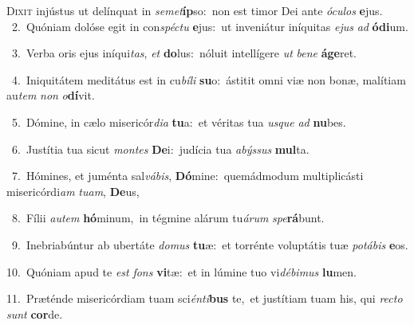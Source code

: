 \lettrine{\initial\textcolor{\initialcolor}{D}}{ixit} injústus ut delínquat in \textit{se}\-\textit{met}\textbf{íp}so:~\star non est timor Dei ante \textit{ó}\-\textit{cu}\textit{los} \textbf{e}\-jus.\\
{\numbfont\textcolor{\numbcolor}{~2.}}~Quóniam dolóse egit in con\-\textit{spéc}\-\textit{tu} \textbf{e}\-jus:~\star ut inveniátur iníquitas \textit{e}\-\textit{jus} \textit{ad} \textbf{ó}\-\textbf{di}um.\par
{\numbfont\textcolor{\numbcolor}{~3.}}~Verba oris ejus iníqui\-\textit{tas}\-, \textit{et} \textbf{do}\-lus:~\star nóluit intellígere \textit{ut} \textit{be}\-\textit{ne} \textbf{á}\-\textbf{ge}ret.\par
{\numbfont\textcolor{\numbcolor}{~4.}}~Iniquitátem meditátus est in cu\-\textit{bí}\-\textit{li} \textbf{su}\-o:~\star ástitit omni viæ non bonæ, malítiam au\textit{tem} \textit{non} \textit{o}\-\textbf{dí}vit.\par
{\numbfont\textcolor{\numbcolor}{~5.}}~Dómine, in cælo misericór\-\textit{di}\-\textit{a} \textbf{tu}\-a:~\star et véritas tua \textit{us}\-\textit{que} \textit{ad} \textbf{nu}\-bes.\par
{\numbfont\textcolor{\numbcolor}{~6.}}~Justítia tua sicut \textit{mon}\-\textit{tes} \textbf{De}\-i:~\star judícia tua \textit{a}\-\textit{býs}\textit{sus} \textbf{mul}\-ta.\par
{\numbfont\textcolor{\numbcolor}{~7.}}~Hómines, et juménta sal\-\textit{vá}\-\textit{bis}, \textbf{Dó}\-mine:~\star quemádmodum multiplicásti misericórdi\textit{am} \textit{tu}\-\textit{am}, \textbf{De}\-us,\par
{\numbfont\textcolor{\numbcolor}{~8.}}~Fílii \textit{au}\-\textit{tem} \textbf{hó}\-minum,~\star in tégmine alárum tu\-\textit{á}\-\textit{rum} \textit{spe}\-\textbf{rá}bunt.\par
{\numbfont\textcolor{\numbcolor}{~9.}}~Inebriabúntur ab ubertáte \textit{do}\-\textit{mus} \textbf{tu}\-æ:~\star et torrénte voluptátis tuæ \textit{po}\-\textit{tá}\textit{bis} \textbf{e}\-os.\par
{\numbfont\textcolor{\numbcolor}{10.}}~Quóniam apud te \textit{est} \textit{fons} \textbf{vi}\-tæ:~\star et in lúmine tuo vi\-\textit{dé}\-\textit{bi}\textit{mus} \textbf{lu}\-men.\par
{\numbfont\textcolor{\numbcolor}{11.}}~Præténde misericórdiam tuam sci\-\textit{én}\-\textit{ti}\textbf{bus} te,~\star et justítiam tuam his, qui \textit{rec}\-\textit{to} \textit{sunt} \textbf{cor}\-de.\par
